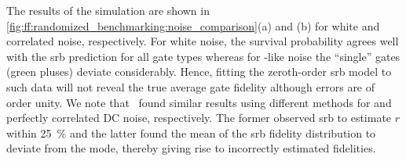 The results of the simulation are shown in \cref{fig:ff:randomized_benchmarking:noise_comparison}(a) and (b) for white and correlated noise, respectively.
For white noise, the survival probability agrees well with the \gls{srb} prediction for all gate types whereas for \oneoverf-like noise the \enquote{single} gates (green pluses) deviate considerably.
Hence, fitting the zeroth-order \gls{srb} model to such data will not reveal the true average gate fidelity although errors are of order unity.
We note that~ found similar results using different methods for \oneoverf and perfectly correlated DC noise, respectively.
The former observed \gls{srb} to estimate $r$ within \qty{25}{\percent} and the latter found the mean of the \gls{srb} fidelity distribution to deviate from the mode, thereby giving rise to incorrectly estimated fidelities.

